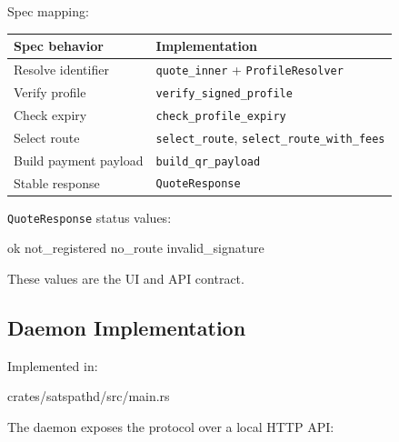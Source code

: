 \documentclass[
]{article}
\newenvironment{Shaded}{}{}
\newcommand{\NormalTok}[1]{#1}
\begin{document}
Spec mapping:

\begin{longtable}[]{@{}ll@{}}
\toprule\noalign{}
Spec behavior & Implementation \\
\midrule\noalign{}
\endhead
\bottomrule\noalign{}
\endlastfoot
Resolve identifier & \texttt{quote\_inner} + \texttt{ProfileResolver} \\
Verify profile & \texttt{verify\_signed\_profile} \\
Check expiry & \texttt{check\_profile\_expiry} \\
Select route & \texttt{select\_route},
\texttt{select\_route\_with\_fees} \\
Build payment payload & \texttt{build\_qr\_payload} \\
Stable response & \texttt{QuoteResponse} \\
\end{longtable}

\texttt{QuoteResponse} status values:

\begin{Shaded}
\begin{Highlighting}[]
\NormalTok{ok}
\NormalTok{not\_registered}
\NormalTok{no\_route}
\NormalTok{invalid\_signature}
\end{Highlighting}
\end{Shaded}

These values are the UI and API contract.

\hypertarget{daemon-implementation}{%
\subsection{Daemon Implementation}\label{daemon-implementation}}

Implemented in:

\begin{Shaded}
\begin{Highlighting}[]
\NormalTok{crates/satspathd/src/main.rs}
\end{Highlighting}
\end{Shaded}

The daemon exposes the protocol over a local HTTP API:
\end{document}
